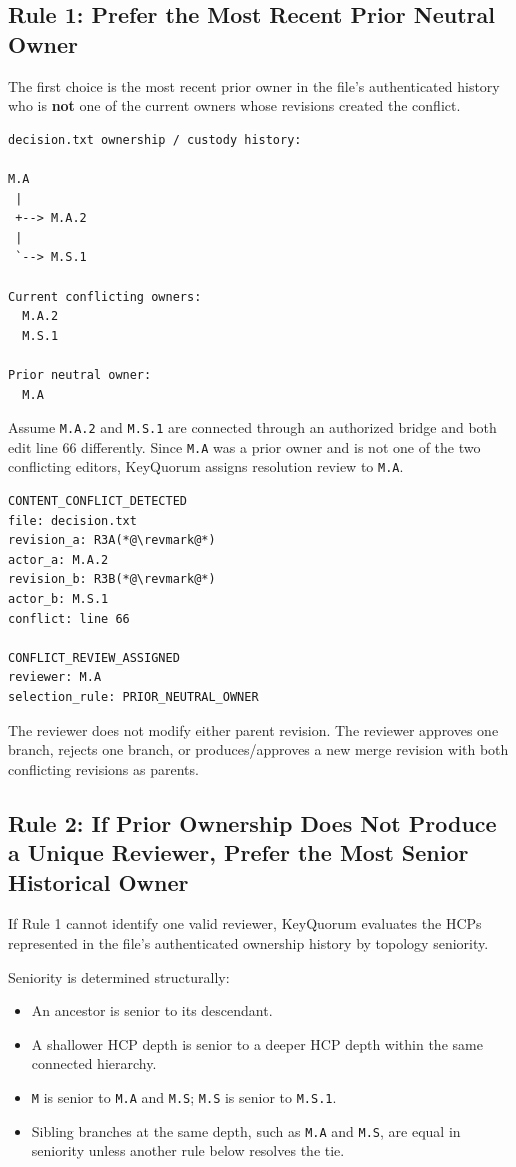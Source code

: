 \documentclass[11pt]{article}
\begin{document}
\subsection{Rule 1: Prefer the Most Recent Prior Neutral Owner}

The first choice is the most recent prior owner in the file's authenticated history who is \textbf{not} one of the current owners whose revisions created the conflict.

\begin{lstlisting}
decision.txt ownership / custody history:

M.A
 |
 +--> M.A.2
 |
 `--> M.S.1

Current conflicting owners:
  M.A.2
  M.S.1

Prior neutral owner:
  M.A
\end{lstlisting}

Assume \texttt{M.A.2} and \texttt{M.S.1} are connected through an authorized bridge and both edit line 66 differently. Since \texttt{M.A} was a prior owner and is not one of the two conflicting editors, KeyQuorum assigns resolution review to \texttt{M.A}.

\begin{lstlisting}
CONTENT_CONFLICT_DETECTED
file: decision.txt
revision_a: R3A(*@\revmark@*)
actor_a: M.A.2
revision_b: R3B(*@\revmark@*)
actor_b: M.S.1
conflict: line 66

CONFLICT_REVIEW_ASSIGNED
reviewer: M.A
selection_rule: PRIOR_NEUTRAL_OWNER
\end{lstlisting}

The reviewer does not modify either parent revision. The reviewer approves one branch, rejects one branch, or produces/approves a new merge revision with both conflicting revisions as parents.

\subsection{Rule 2: If Prior Ownership Does Not Produce a Unique Reviewer, Prefer the Most Senior Historical Owner}

If Rule 1 cannot identify one valid reviewer, KeyQuorum evaluates the HCPs represented in the file's authenticated ownership history by topology seniority.

Seniority is determined structurally:
\begin{itemize}[leftmargin=1.5em]
  \item An ancestor is senior to its descendant.
  \item A shallower HCP depth is senior to a deeper HCP depth within the same connected hierarchy.
  \item \texttt{M} is senior to \texttt{M.A} and \texttt{M.S}; \texttt{M.S} is senior to \texttt{M.S.1}.
  \item Sibling branches at the same depth, such as \texttt{M.A} and \texttt{M.S}, are equal in seniority unless another rule below resolves the tie.
\end{itemize}
\end{document}
